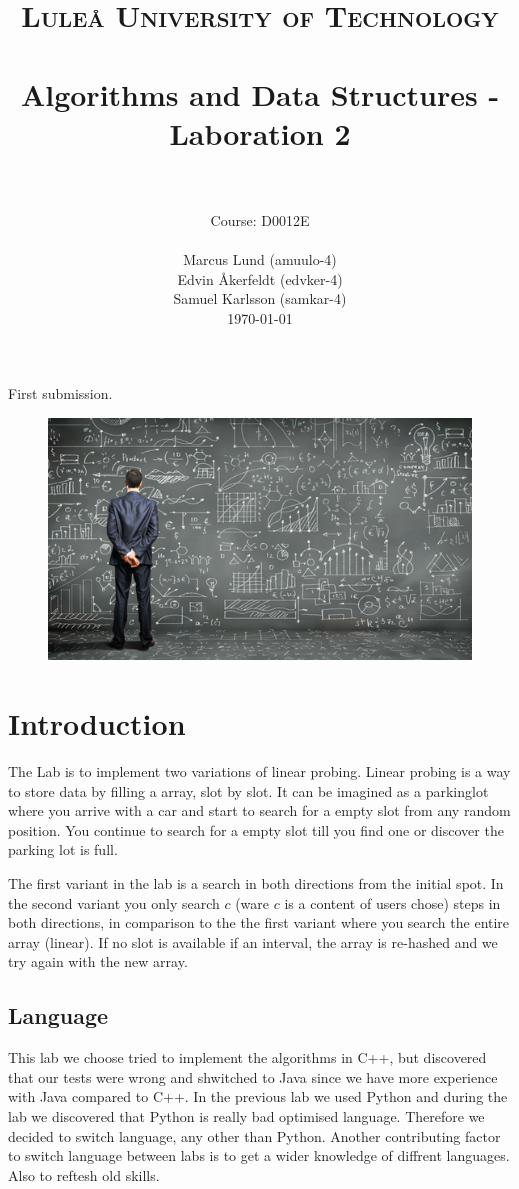\documentclass[paper=a4, fontsize=11pt]{scrartcl}
\title{
		\usefont{OT1}{bch}{b}{n}
		\normalfont \normalsize \textsc{Luleå University of Technology} \\ [25pt]
		\horrule{0.5pt} \\[0.4cm]
		\huge Algorithms and Data Structures - Laboration 2 \\
		\horrule{2pt} \\[0.5cm]
}
\author{Course: D0012E \\ \\ 
		\normalfont 								\normalsize
        Marcus Lund (amuulo-4) \\\normalfont\normalsize Edvin Åkerfeldt (edvker-4)\\\normalfont\normalsize Samuel Karlsson (samkar-4)\\[-3pt]		\normalsize
        \today
}
\date{}
\numberwithin{equation}{section}		%
\numberwithin{figure}{section}			%
\numberwithin{table}{section}				%
\begin{document}
\maketitle
\centerline{First submission.}
\begin{figure}[h!]
  \centering
    \includegraphics[width=1\textwidth]{algorithm}
\end{figure}
\newpage
\tableofcontents
\newpage

\section{Introduction}
The Lab is to implement two variations of linear probing. Linear probing is a way to store data by filling a array, slot by slot. It can be imagined as a parkinglot where you arrive with a car and start to search for a empty slot from any random position. You continue to search for a empty slot till you find one or discover the parking lot is full.

The first variant in the lab is a search in both directions from the initial spot. In the second variant you only search $c$ (ware $c$ is a content of users chose) steps in both directions, in comparison to the the first variant where you search the entire array (linear). If no slot is available if an interval, the array is re-hashed and we try again with the new array.

\subsection{Language}
This lab we choose tried to implement the algorithms in C++, but discovered that our tests were wrong and shwitched to Java since we have more experience with Java compared to C++. In the previous lab we used Python and during the lab we discovered that Python is really bad optimised language. Therefore we decided to switch language, any other than Python. Another contributing factor to switch language between labs is to get a wider knowledge of diffrent languages. Also to reftesh old skills.
\end{document}
